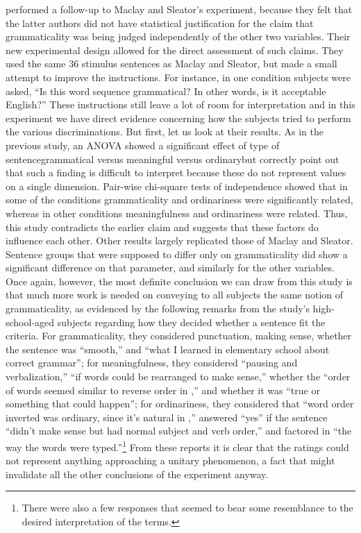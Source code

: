 \citet{VetterEtAl1979} performed a follow-up to Maclay and Sleator's experiment, because they felt that the latter authors did not have statistical justification for the claim that grammaticality was being judged independently of the other two variables. Their new experimental design allowed for the direct assessment of such claims. They used the same 36 stimulus sentences as
Maclay
and Sleator, but made a small attempt to improve the instructions. For instance, in one condition subjects were asked, ``Is this word sequence grammatical? In other words, is it acceptable English?'' These instructions still leave a lot of room for
interpretation and in this experiment we have direct evidence concerning how the
subjects tried to perform the various discriminations. But first, let us look at their results. As in the previous study, an ANOVA showed a significant effect of type of sentence\schdash{}grammatical versus meaningful versus ordinary\schdash{}but \citeauthor{VetterEtAl1979}  correctly point out that such a finding is difficult to interpret because these do not represent values on a single dimension. Pair-wise chi-square tests of independence showed that in some of the conditions grammaticality and ordinariness were significantly related, whereas in other conditions meaningfulness and ordinariness were related. Thus, this study contradicts the earlier claim and suggests that these factors do influence each other. Other results largely replicated those of Maclay and Sleator. Sentence groups that were supposed to differ only on grammaticality did show a significant difference on that parameter, and similarly for the other variables. Once again, however, the most definite conclusion we can draw from this study is that much more work is needed on conveying to all subjects the same notion of grammaticality, as evidenced by the following remarks from the study's high-school-aged subjects regarding how they decided whether a sentence fit the criteria. For grammaticality, they considered punctuation, making sense, whether the sentence was ``smooth,'' and ``what I learned in elementary school about correct grammar''; for meaningfulness, they considered ``pausing and  verbalization,'' ``if words could be  rearranged to make sense,'' whether the ``order of words seemed similar to reverse order in ,'' and whether it was ``true or something that could happen''; for ordinariness, they considered that ``word order inverted was ordinary, since it's natural in ,'' answered ``yes'' if the sentence ``didn't make sense but had normal subject and verb order,'' and factored in ``the way the words were typed.''\footnote{There were also a few responses that seemed to bear some resemblance to the desired interpretation of the terms.}
From these reports it is clear that the ratings could not represent anything approaching a unitary phenomenon, a fact that might invalidate all the other conclusions of the experiment anyway.


